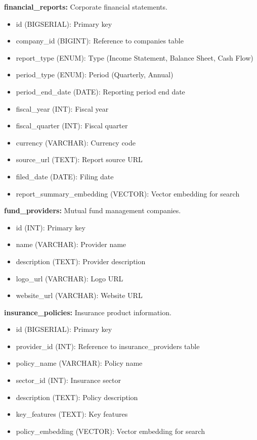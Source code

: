 \documentclass[12pt,a4paper]{report}
\begin{document}
\textbf{financial\_reports:} Corporate financial statements.
\begin{itemize}
    \item id (BIGSERIAL): Primary key
    \item company\_id (BIGINT): Reference to companies table
    \item report\_type (ENUM): Type (Income Statement, Balance Sheet, Cash Flow)
    \item period\_type (ENUM): Period (Quarterly, Annual)
    \item period\_end\_date (DATE): Reporting period end date
    \item fiscal\_year (INT): Fiscal year
    \item fiscal\_quarter (INT): Fiscal quarter
    \item currency (VARCHAR): Currency code
    \item source\_url (TEXT): Report source URL
    \item filed\_date (DATE): Filing date
    \item report\_summary\_embedding (VECTOR): Vector embedding for search
\end{itemize}

\textbf{fund\_providers:} Mutual fund management companies.
\begin{itemize}
    \item id (INT): Primary key
    \item name (VARCHAR): Provider name
    \item description (TEXT): Provider description
    \item logo\_url (VARCHAR): Logo URL
    \item website\_url (VARCHAR): Website URL
\end{itemize}

\textbf{insurance\_policies:} Insurance product information.
\begin{itemize}
    \item id (BIGSERIAL): Primary key
    \item provider\_id (INT): Reference to insurance\_providers table
    \item policy\_name (VARCHAR): Policy name
    \item sector\_id (INT): Insurance sector
    \item description (TEXT): Policy description
    \item key\_features (TEXT): Key features
    \item policy\_embedding (VECTOR): Vector embedding for search
\end{itemize}
\end{document}
